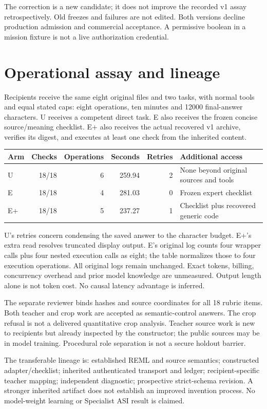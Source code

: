 \documentclass[10 pt]{article}
\begin{document}
The correction is a new candidate; it does not improve the recorded v1 assay retrospectively. Old freezes and failures are not edited. Both versions decline production admission and commercial acceptance. A permissive boolean in a mission fixture is not a live authorization credential.

\section{Operational assay and lineage}

Recipients receive the same eight original files and two tasks, with normal tools and equal stated caps: eight operations, ten minutes and 12000 final-answer characters. U receives a competent direct task. E also receives the frozen concise source/meaning checklist. E+ also receives the actual recovered v1 archive, verifies its digest, and executes at least one check from the inherited content.

\begin{tabularx}{\textwidth}{lrrrrY}
\toprule
Arm &Checks &Operations &Seconds &Retries &Additional access\\
\midrule
U&18/18&6&259.94&2&None beyond original sources and tools\\
E&18/18&4&281.03&0&Frozen expert checklist\\
E+&18/18&5&237.27&1&Checklist plus recovered generic code\\
\bottomrule
\end{tabularx}

U's retries concern condensing the saved answer to the character budget. E+'s extra read resolves truncated display output. E's original log counts four wrapper calls plus four nested execution calls as eight; the table normalizes those to four execution operations. All original logs remain unchanged. Exact tokens, billing, concurrency overhead and prior model knowledge are unmeasured. Output length alone is not token cost. No causal latency advantage is inferred.

The separate reviewer binds hashes and source coordinates for all 18 rubric items. Both teacher and crop work are accepted as semantic-control answers. The crop refusal is not a delivered quantitative crop analysis. Teacher source work is new to recipients but already inspected by the constructor; the public sources may be in model training. Procedural role separation is not a secure holdout barrier.

The transferable lineage is: established REML and source semantics; constructed adapter/checklist; inherited authenticated transport and ledger; recipient-specific teacher mapping; independent diagnostic; prospective strict-schema revision. A stronger inherited artifact does not establish an improved invention process. No model-weight learning or Specialist ASI result is claimed.
\end{document}
